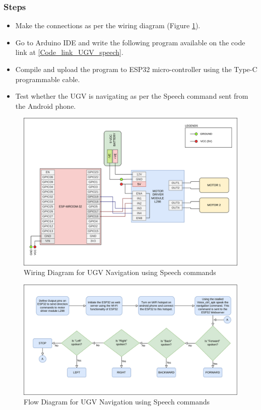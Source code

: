 \subsubsection{Steps}
\begin{itemize}
    \item Make the connections as per the wiring diagram (Figure \ref{Wiring_UGV_speech}).
    \item Go to Arduino IDE and write the following program available on the code link at \ref{Code_link_UGV_speech}.
    \item Compile and upload the program to ESP32 micro-controller using the Type-C programmable cable. 
    \item Test whether the UGV is navigating as per the Speech command sent from the Android phone.
\end{itemize}

\begin{figure}[h!]
\centering
\includegraphics[width=\columnwidth]{./Figures/Wiring_UGV_speech.png}
\caption{Wiring Diagram for UGV Navigation using Speech commands}
\label{Wiring_UGV_speech}
\end{figure}

\begin{figure}[h!]
\centering
\includegraphics[width=\columnwidth]{./Figures/Flow_UGV_speech.png}
\caption{Flow Diagram for UGV Navigation using Speech commands}
\label{Flow_UGV_speech}
\end{figure}

